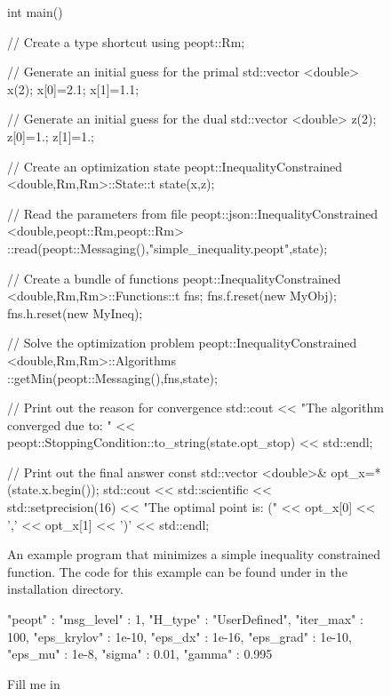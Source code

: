 \documentclass{report}
\begin{document}
\begin{figure}
\ContinuedFloat
\begin{lstCpp}
int main(){
    // Create a type shortcut
    using peopt::Rm;
    
    // Generate an initial guess for the primal
    std::vector <double> x(2);
    x[0]=2.1; x[1]=1.1;
    
    // Generate an initial guess for the dual
    std::vector <double> z(2);
    z[0]=1.; z[1]=1.;
    
    // Create an optimization state
    peopt::InequalityConstrained <double,Rm,Rm>::State::t
        state(x,z);
    
    // Read the parameters from file
    peopt::json::InequalityConstrained <double,peopt::Rm,peopt::Rm>
        ::read(peopt::Messaging(),"simple_inequality.peopt",state);
    
    // Create a bundle of functions
    peopt::InequalityConstrained <double,Rm,Rm>::Functions::t fns;
    fns.f.reset(new MyObj);
    fns.h.reset(new MyIneq);
    
    // Solve the optimization problem
    peopt::InequalityConstrained <double,Rm,Rm>::Algorithms
        ::getMin(peopt::Messaging(),fns,state);
    
    // Print out the reason for convergence
    std::cout << "The algorithm converged due to: " <<
        peopt::StoppingCondition::to_string(state.opt_stop) <<
        std::endl;
    
    // Print out the final answer
    const std::vector <double>& opt_x=*(state.x.begin());
    std::cout << std::scientific << std::setprecision(16)
        << "The optimal point is: (" << opt_x[0] << ','
        << opt_x[1] << ')' << std::endl;
}
\end{lstCpp}
\caption{An example program that minimizes a simple inequality constrained function.  The code for this example can be found under \protect{} in the installation directory.}
\label{fig:simpleIneq}
\end{figure}

\begin{figure}
\begin{lstPeoptJSON}
{
   "peopt" : {
      "msg_level" : 1,
      "H_type" : "UserDefined",
      "iter_max" : 100,
      "eps_krylov" : 1e-10,
      "eps_dx" : 1e-16,
      "eps_grad" : 1e-10,
      "eps_mu" : 1e-8,
      "sigma" : 0.01,
      "gamma" : 0.995
   }
}
\end{lstPeoptJSON}
\caption{Fill me in}
\label{fig:simpleIneqJSON}
\end{figure}
\end{document}
